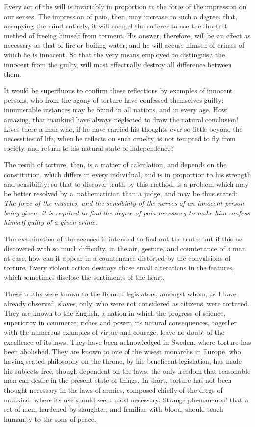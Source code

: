 Every act of the will is invariably in proportion to the force of the
impression on our senses. The impression of pain, then, may increase
to such a degree, that, occupying the mind entirely, it will compel
the sufferer to use the shortest method of freeing himself from
torment. His answer, therefore, will be an effect as necessary as that
of fire or boiling water; and he will  accuse himself of
crimes of which he is innocent. So that the very means employed to
distinguish the innocent from the guilty, will most effectually
destroy all difference between them.

It would be superfluous to confirm these reflections by examples of
innocent persons, who from the agony of torture have confessed
themselves guilty: innumerable instances may be found in all nations,
and in every age. How amazing, that mankind have always neglected to
draw the natural conclusion! Lives there a man who, if he have carried
his thoughts ever so little beyond the necessities of life, when he
reflects on such cruelty, is not tempted to fly from society, and
return to his natural state of independence?


The result of torture, then, is a matter of calculation, and depends
on the constitution, which differs in every individual, and is in
proportion to his strength and sensibility; so that to discover truth
by this method, is a problem which may be better resolved by a
mathematician than a judge, and may be thus stated: \textit{The force
of the muscles, and the sensibility of the nerves of an innocent
person being given, it is required to find the degree of pain
necessary to make him confess himself guilty of a given crime}.

The examination of the accused is intended to  find out the
truth; but if this be discovered with so much difficulty, in the air,
gesture, and countenance of a man at ease, how can it appear in a
countenance distorted by the convulsions of torture. Every violent
action destroys those small alterations in the features, which
sometimes disclose the sentiments of the heart.

These truths were known to the Roman legislators, amongst whom, as I
have already observed, slaves, only, who were not considered as
citizens, were tortured. They are known to the English, a nation in
which the progress of science, superiority in commerce, riches and
power, its natural consequences, together with the numerous examples
of virtue and courage, leave no doubt of the excellence of its laws.
They have been acknowledged in Sweden, where torture has been
abolished. They are known to one of the wisest monarchs in Europe,
who, having seated philosophy on the throne, by his beneficent
legislation, has made his subjects free, though dependent on the laws;
the only freedom that reasonable men can desire in the present state
of things. In short, torture has not been thought necessary in the
laws of armies, composed chiefly of the dregs of mankind, where its
use should seem most necessary. Strange phenomenon! that a set of men,
hardened by  slaughter, and familiar with blood, should teach
humanity to the sons of peace.

